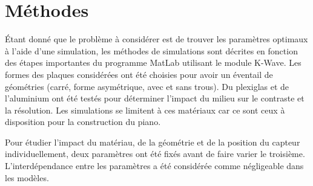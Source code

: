 \documentclass[conference]{IEEEtran}
\begin{document}
\section{Méthodes \label{methodes}}


Étant donné que le problème à considérer est de trouver les paramètres 
optimaux à l'aide d'une simulation, les méthodes de simulations sont décrites
en fonction des étapes importantes du programme MatLab utilisant le module K-Wave. %
Les formes des plaques considérées ont été choisies pour avoir un éventail de 
géométries (carré, forme asymétrique, avec et sans trous). Du plexiglas et de 
l'aluminium ont été testés pour déterminer l'impact du milieu sur le contraste et la résolution. 
Les simulations se limitent à ces matériaux car ce sont ceux à disposition 
pour la construction du piano.

Pour étudier l'impact du matériau, de la géométrie et de la position du capteur
individuellement, deux paramètres ont été fixés avant de faire varier le troisième. 
L'interdépendance entre les paramètres a été considérée comme négligeable dans 
les modèles.
\end{document}
